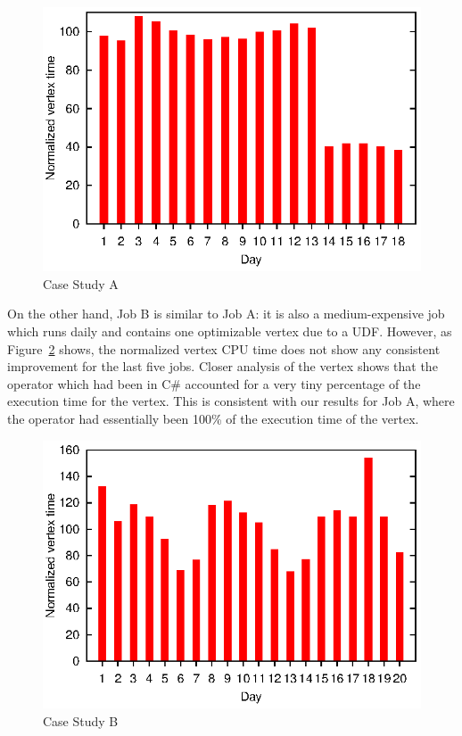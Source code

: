 \begin{figure}[ht]
\includegraphics{graphs/normalizedTimes}
\caption{Case Study A \label{fig:CaseStudyA}}
\end{figure}

On the other hand, Job B is similar to Job A: it is also a medium-expensive job which runs daily and contains one optimizable vertex due to a UDF.
However, as Figure~\ref{fig:CaseStudyB} shows, the normalized vertex CPU time does not show any consistent improvement for the last five jobs.
Closer analysis of the vertex shows that the operator which had been in C\# accounted for a very tiny percentage of the execution time for the vertex.
This is consistent with our results for Job A, where the operator had essentially been 100\% of the execution time of the vertex.
\begin{figure}[ht]
\includegraphics{graphs/normalizedTimesB}
\caption{Case Study B \label{fig:CaseStudyB}}
\end{figure}


